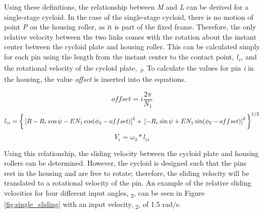 Using these definitions, the relationship between \textit{M} and \textit{L} can be derived for a single-stage cycloid. In the case of the single-stage cycloid, there is no motion of point \textit{P} on the housing roller, as it is part of the fixed frame. Therefore, the only relative velocity between the two links comes with the rotation about the instant center between the cycloid plate and housing roller. This can be calculated simply for each pin using the length from the instant center to the contact point, \textit{l\textsubscript{c}}, and the rotational velocity of the cycloid plate, \textit{\textomega\textsubscript{3}}. To calculate the values for pin \textit{i} in the housing, the value \textit{offset} is inserted into the equations.  

\begin{equation} \label{eq:single_slide_offset}
offset = i \frac{2\pi}{N_1}
\end{equation}
\begin{dmath} \label{eq:single_slide_length}
l_{ci} = \bigg\{\left[R-R_r\cos\psi - E N_1 \cos(\phi_2 - offset)\right]^2 
+\\ \left[-R_r \sin{\psi} + E N_1 \sin(\phi_2 - offset)\right]^2 \bigg\}^{1/2}
\end{dmath}
\begin{equation} \label{eq:single_slide_vel}
V_i = \omega_3 * l_{ci}
\end{equation}

Using this relationship, the sliding velocity between the cycloid plate and housing rollers can be determined. However, the cycloid is designed such that the pins rest in the housing and are free to rotate; therefore, the sliding velocity will be translated to a rotational velocity of the pin. An example of the relative sliding velocities for four different input angles, \textphi\textsubscript{2}, can be seen in Figure \ref{fig:single_sliding} with an input velocity, \textomega\textsubscript{2}, of 1.5 rad/s.

